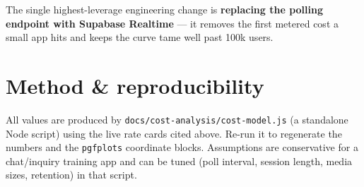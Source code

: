 \documentclass[11pt]{article}
\begin{document}
The single highest-leverage engineering change is \textbf{replacing the polling endpoint with Supabase Realtime} — it removes the first metered cost a small app hits and keeps the curve tame well past 100k users.

\appendix
\section{Method \& reproducibility}
All values are produced by \texttt{docs/cost-analysis/cost-model.js} (a standalone Node script) using the live rate cards cited above. Re-run it to regenerate the numbers and the \texttt{pgfplots} coordinate blocks. Assumptions are conservative for a chat/inquiry training app and can be tuned (poll interval, session length, media sizes, retention) in that script.
\end{document}
